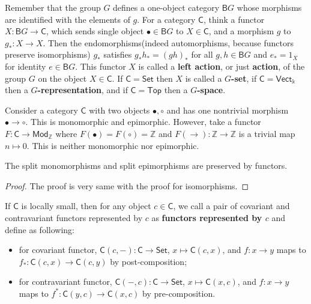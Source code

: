 \begin{exmp} Remember that the group $G$ defines a one-object category $\mathsf{B}G$ whose morphisms are identified with the elements of $g$. For a category $\mathsf{C}$, think a functor $X:\mathsf{B}G\rightarrow \mathsf{C}$, which sends single object $\bullet\in\mathsf{B}G$ to $X\in\mathsf{C}$, and a morphism $g$ to $g_*:X\rightarrow X$. Then the endomorphisms(indeed automorphisms, because functors preserve isomorphisms) $g_*$ satisfies $g_* h_*=(gh)_*$ for all $g,h\in\mathsf{B}G$ and $e_*=1_X$ for identity $e\in\mathsf{B}G$. This functor $X$ is called a \textbf{left action}, or just \textbf{action}, of the group $G$ on the object $X\in\mathsf{C}$. If $\mathsf{C}=\mathsf{Set}$ then $X$ is called a \textbf{$G$-set}, if $\mathsf{C}=\mathsf{Vect}_{\mathbb{k}}$ then a \textbf{$G$-representation}, and if $\mathsf{C}=\mathsf{Top}$ then a \textbf{$G$-space}.
\end{exmp}

\begin{exmp} Consider a category $\mathsf{C}$ with two objects $\bullet,\circ$ and has one nontrivial morphism $\bullet\rightarrow \circ$. This is monomorphic and epimorphic. However, take a functor $F:\mathsf{C}\rightarrow \mathsf{Mod}_{\mathbb{Z}}$ where $F(\bullet)=F(\circ)=\mathbb{Z}$ and $F(\rightarrow):\mathbb{Z}\rightarrow \mathbb{Z}$ is a trivial map $n\mapsto 0$. This is neither monomorphic nor epimorphic.
\end{exmp}

\begin{prop} The split monomorphisms and split epimorphisms are preserved by functors.
\end{prop}
\begin{proof}
The proof is very same with the proof for isomorphisms.
\end{proof}

\begin{defn} If $\mathsf{C}$ is locally small, then for any object $c\in \mathsf{C}$, we call a pair of covariant and contravariant functors represented by $c$ as \textbf{functors represented by $c$} and define as following:
\begin{itemize}
\item for covariant functor, $\mathsf{C}(c,-):\mathsf{C}\rightarrow \mathsf{Set}$, $x\mapsto \mathsf{C}(c,x)$, and $f:x\rightarrow y$ maps to $f_*:\mathsf{C}(c,x)\rightarrow \mathsf{C}(c,y)$ by post-composition;
\item for contravariant functor, $\mathsf{C}(-,c):\mathsf{C}\rightarrow \mathsf{Set}$, $x\mapsto \mathsf{C}(x,c)$, and $f:x\rightarrow y$ maps to $f^*:\mathsf{C}(y,c)\rightarrow \mathsf{C}(x,c)$ by pre-composition.
\end{itemize}
\end{defn}

